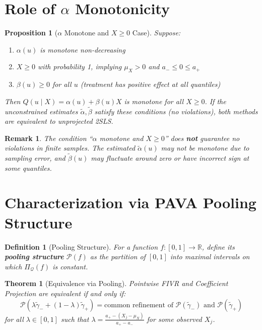 \documentclass[12pt]{article}
\newcommand{\R}{\mathbb{R}}
\newcommand{\PiQ}{\Pi_{\mathcal{Q}}}
\newtheorem{theorem}{Theorem}
\newtheorem{proposition}{Proposition}
\newtheorem{remark}{Remark}
\newtheorem{definition}{Definition}
\begin{document}
\section{Role of $\alpha$ Monotonicity}

\begin{proposition}[$\alpha$ Monotone and $X \geq 0$ Case]\label{prop:alpha_mono}
Suppose:
\begin{enumerate}
\item $\alpha(u)$ is monotone non-decreasing
\item $X \geq 0$ with probability 1, implying $\mu_X > 0$ and $a_- \leq 0 \leq a_+$
\item $\beta(u) \geq 0$ for all $u$ (treatment has positive effect at all quantiles)
\end{enumerate}
Then $Q(u \mid X) = \alpha(u) + \beta(u)X$ is monotone for all $X \geq 0$. If the unconstrained estimates $\tilde{\alpha}, \tilde{\beta}$ satisfy these conditions (no violations), both methods are equivalent to unprojected 2SLS.
\end{proposition}

\begin{remark}
The condition ``$\alpha$ monotone and $X \geq 0$'' does \textbf{not} guarantee no violations in finite samples. The estimated $\tilde{\alpha}(u)$ may not be monotone due to sampling error, and $\tilde{\beta}(u)$ may fluctuate around zero or have incorrect sign at some quantiles.
\end{remark}

\section{Characterization via PAVA Pooling Structure}

\begin{definition}[Pooling Structure]
For a function $f: [0,1] \to \R$, define its \textbf{pooling structure} $\mathcal{P}(f)$ as the partition of $[0,1]$ into maximal intervals on which $\PiQ(f)$ is constant.
\end{definition}

\begin{theorem}[Equivalence via Pooling]\label{thm:pooling}
Pointwise FIVR and Coefficient Projection are equivalent if and only if:
\[
\mathcal{P}(\lambda \tilde{\gamma}_- + (1-\lambda) \tilde{\gamma}_+) = \text{common refinement of } \mathcal{P}(\tilde{\gamma}_-) \text{ and } \mathcal{P}(\tilde{\gamma}_+)
\]
for all $\lambda \in [0,1]$ such that $\lambda = \frac{a_+ - (X_j - \mu_X)}{a_+ - a_-}$ for some observed $X_j$.
\end{theorem}
\end{document}
